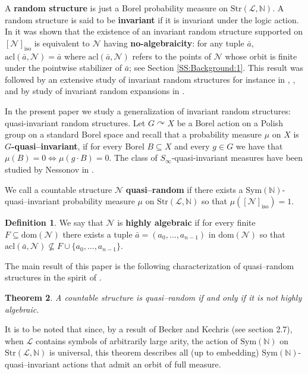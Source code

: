 \documentclass[11pt]{amsart}
\theoremstyle{plain}
\newtheorem{theorem}{Theorem}%
\theoremstyle{definition}
\newtheorem{definition}[theorem]{Definition}
\newcommand{\Ell}{\mathcal{L}}
\newcommand{\N}{\mathbb{N}}
\begin{document}
A {\bf random structure} is just a Borel probability measure on $\mathrm{Str}(\Ell,\N)$. A random structure is said to be {\bf invariant} if it is invariant under the logic action. In \cite{AFP} it was shown that the existence of an invariant random structure supported on $[\mathcal{N}]_{\mathrm{iso}}$ is equivalent to $\mathcal{N}$ having {\bf no-algebraicity}:  for any tuple $\bar a$, $\mathrm{acl}(\bar{a},\mathcal{N})=\bar{a}$ where $\mathrm{acl}(\bar{a},\mathcal{N})$ refers to the  points of $\mathcal{N}$ whose orbit is finite under the pointwise stabilizer of $\bar{a}$; see Section \ref{SS:Background:1}. This result was followed by an extensive study of invariant random structures for instance in \cite{AFKrucmanP}, \cite{AFKwiatowskaP}, \cite{CraneTowsner} and by study of invariant random expansions in \cite{JahelJoseph}.

In the present paper we study a generalization of invariant random structures: quasi-invariant random structures. Let $G\curvearrowright X$ be a Borel action on a Polish group on a standard Borel space and recall that a  probability measure $\mu$ on $X$ is {\bf $G$-quasi--invariant},  if for every Borel $B\subseteq X$ and every $g\in G$ we have that $\mu(B)=0 \iff \mu (g\cdot B)=0$. The class of $S_\infty$-quasi-invariant measures have been studied by Nessonov in \cite{Nessonov}.





We call a countable structure $\mathcal{N}$ {\bf quasi--random} if there exists a $\mathrm{Sym}(\mathbb{N})$-quasi--invariant probability measure $\mu$ on $\mathrm{Str}(\mathcal{L},\mathbb{N})$ so that $\mu([\mathcal{N}]_{\mathrm{iso}})=1$.  
\begin{definition}
We say that $\mathcal{N}$ is {\bf highly algebraic} if for every finite $F\subseteq \mathrm{dom}(\mathcal{N})$ there exists a  tuple $\bar{a}=(a_0,\ldots,a_{n-1})$ in $\mathrm{dom}(\mathcal{N})$ so that $\mathrm{acl}(\bar{a},\mathcal{N})\not\subseteq F\cup\{a_0,\ldots,a_{n-1}\}$. 
\end{definition} 


The main result of this paper is the following characterization of quasi--random structures in the spirit of  \cite{AFP}.


\begin{theorem}\label{T:main}
A countable structure is quasi--random if and only if it is not highly algebraic.
\end{theorem}


It is to be noted that since, by a result of Becker and Kechris (see \cite{BK96} section 2.7), when $\mathcal{L}$ contains symbols of arbitrarily large arity, the action of $\mathrm{Sym}(\N)$ on $\mathrm{Str}(\Ell,\N)$ is universal, this theorem describes all (up to embedding) $\mathrm{Sym}(\N)$-quasi--invariant actions that admit an orbit of full measure.
\end{document}

